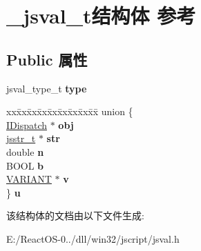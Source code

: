 \hypertarget{struct__jsval__t}{}\section{\+\_\+jsval\+\_\+t结构体 参考}
\label{struct__jsval__t}
\subsection*{Public 属性}
\begin{DoxyCompactItemize}
\item 
\mbox{\label{struct__jsval__t_a538b95c5b2e9227bbae6cdd2bce4e6f6}} 
jsval\+\_\+type\+\_\+t {\bfseries type}
\item 
\mbox{\label{struct__jsval__t_a29208125054da8ca79ccecf77124bd74}} 
\begin{tabbing}
xx\=xx\=xx\=xx\=xx\=xx\=xx\=xx\=xx\=\kill
union \{\\
\>\hyperlink{interface_i_dispatch}{IDispatch} $\ast$ {\bfseries obj}\\
\>\hyperlink{struct__jsstr__t}{jsstr\_t} $\ast$ {\bfseries str}\\
\>double {\bfseries n}\\
\>BOOL {\bfseries b}\\
\>\hyperlink{structtag_v_a_r_i_a_n_t}{VARIANT} $\ast$ {\bfseries v}\\
\} {\bfseries u}\\

\end{tabbing}\end{DoxyCompactItemize}


该结构体的文档由以下文件生成\+:\begin{DoxyCompactItemize}
\item 
E\+:/\+React\+O\+S-\/0../dll/win32/jscript/jsval.\+h\end{DoxyCompactItemize}
